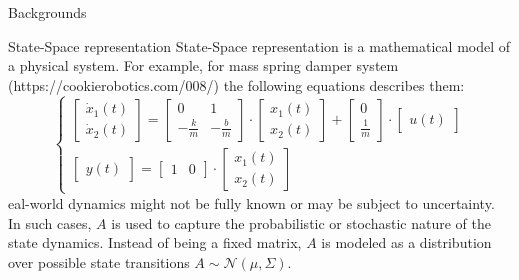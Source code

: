 \documentclass{beamer}
\begin{document}
\begin{frame}{Backgrounds}
    \begin{block}{State-Space representation}
        State-Space representation is a mathematical model of a physical system. For example, for mass spring damper system (https://cookierobotics.com/008/) the following equations describes them:
        \begin{equation}\label{MSDS}
            \begin{cases}
            \begin{bmatrix}
                \Dot{x}_1(t) \\
                \Dot{x}_2(t)
            \end{bmatrix} = \begin{bmatrix}
                0 & 1 \\
                - \frac{k}{m} & - \frac{b}{m}
            \end{bmatrix} \cdot \begin{bmatrix}
                x_1(t) \\
                x_2(t)
            \end{bmatrix} + \begin{bmatrix}
                0 \\
                \frac{1}{m}
            \end{bmatrix} \cdot \begin{bmatrix}
                u(t)
            \end{bmatrix} \\
            
            \begin{bmatrix}
                y(t)
            \end{bmatrix}  = \begin{bmatrix}
                1 & 0
            \end{bmatrix} \cdot \begin{bmatrix}
                x_1(t) \\
                x_2(t)
            \end{bmatrix}
            \end{cases}
        \end{equation}
        eal-world dynamics might not be fully known or may be subject to uncertainty. In such cases, $A$ is used to capture the probabilistic or stochastic nature of the state dynamics. Instead of being a fixed matrix, $A$ is modeled as a distribution over possible state transitions $A \sim \mathcal{N}(\mu, \Sigma)$.
    \end{block}
\end{frame}
\end{document}
